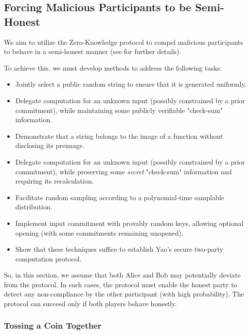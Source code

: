 
\subsection{Forcing Malicious Participants to be Semi-Honest}

We aim to utilize the Zero-Knowledge protocol to compel malicious participants to behave in a semi-honest manner (see  for further details).

To achieve this, we must develop methods to address the following tasks:

\begin{itemize}
    \item Jointly select a public random string to ensure that it is generated uniformly.
    \item Delegate computation for an unknown input (possibly constrained by a prior commitment), while maintaining some publicly verifiable "check-sum" information.
    \item Demonstrate that a string belongs to the image of a function without disclosing its preimage.
    \item Delegate computation for an unknown input (possibly constrained by a prior commitment), while preserving some \emph{secret} "check-sum" information and requiring its recalculation.
    \item Facilitate random sampling according to a polynomial-time samplable distribution.
    \item Implement input commitment with provably random keys, allowing optional opening (with some commitments remaining unopened).
    \item Show that these techniques suffice to establish Yao's secure two-party computation protocol.
\end{itemize}


So, in this section, we assume that both Alice and Bob may potentially deviate from the protocol. 
In such cases, the protocol must enable the honest party to detect any non-compliance by the other participant (with high probability). 
The protocol can succeed only if both players behave honestly.

\subsubsection{Tossing a Coin Together}

